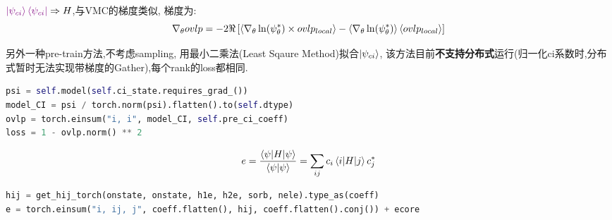 $\textcolor{violet}{\ket{\psi_{ci}}\bra{\psi_{ci}}}\Rightarrow H $,与VMC的梯度类似, 梯度为:
\begin{equation}
    \nabla_{\theta}ovlp = -2\Re\left[\braket{\nabla_{\theta}\ln(\psi_{\theta}^*) \times ovlp_{local}}
                        -\braket{\nabla_{\theta}\ln(\psi_{\theta}^*)}\braket{ovlp_{local}}\right]
\end{equation}

另外一种pre-train方法,不考虑sampling, 用最小二乘法(Least Sqaure Method)拟合$\ket{\psi_{ci}}$,
该方法目前\textbf{不支持分布式}运行(归一化ci系数时,分布式暂时无法实现带梯度的Gather),每个rank的loss都相同.
\begin{lstlisting}[language=Python]
psi = self.model(self.ci_state.requires_grad_())
model_CI = psi / torch.norm(psi).flatten().to(self.dtype)
ovlp = torch.einsum("i, i", model_CI, self.pre_ci_coeff)
loss = 1 - ovlp.norm() ** 2
\end{lstlisting}
\begin{equation}
    e = \frac{\braket{\psi|H|\psi}}{\braket{\psi|\psi}} = \sum_{ij}c_i\braket{i|H|j}c_j^*
    \label{ci}
\end{equation}

\begin{lstlisting}[language=Python]
hij = get_hij_torch(onstate, onstate, h1e, h2e, sorb, nele).type_as(coeff)
e = torch.einsum("i, ij, j", coeff.flatten(), hij, coeff.flatten().conj()) + ecore
\end{lstlisting}


